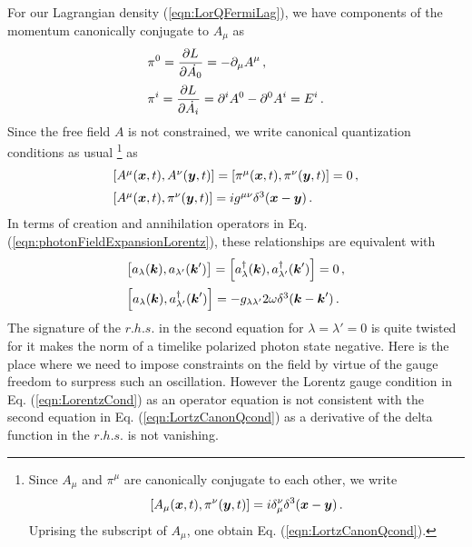 For our Lagrangian density (\ref{eqn:LorQFermiLag}), we have
components of the momentum canonically conjugate to $A_\mu$ as
\begin{eqnarray}
\begin{array}{l}
\displaystyle
\pi^0 
= 
\frac{\partial L_{}}{\partial \dot{A_0}}
= 
- \partial_\mu A^\mu \,,
\vspace{2mm}
\\
\displaystyle
\pi^i =
\frac{\partial L_{}}
{\partial \dot{A_i}}
=
\partial^i A^0 - \partial^0 A^i
= 
E^i \,.
\end{array}
\end{eqnarray}
Since the free field $A$ is not constrained, we write canonical quantization conditions 
as usual
\footnote{%
Since $A_\mu$ and $\pi^\mu$ are canonically conjugate to each other,
we write
\begin{eqnarray*}
\left[
A_\mu(\mbox{\boldmath $x$}, t),  \pi^\nu(\mbox{\boldmath $y$}, t)
\right]
=
i \delta_\mu^{\nu} \delta^3( \mbox{\boldmath $x$} - \mbox{\boldmath $y$}) \,.
\end{eqnarray*}
Uprising the subscript of $A_\mu$, one obtain
Eq. (\ref{eqn:LortzCanonQcond}).
}%
 as
\begin{eqnarray}
\begin{array}{l}
\left[
A^\mu(\bld{x}, t),  A^\nu(\bld{y}, t)
\right]
=
\left[
\pi^\mu(\bld{x}, t),  \pi^\nu(\bld{y}, t)
\right]
= 0 \,,
\vspace{2mm}
\\
\left[
A^\mu(\bld{x}, t),  \pi^\nu(\bld{y}, t)
\right]
=
i g^{\mu \nu} \delta^3( \bld{x} - \bld{y}) \,.
\label{eqn:LortzCanonQcond}
\end{array}
\end{eqnarray}
In terms of creation and annihilation operators in Eq. (\ref{eqn:photonFieldExpansionLorentz}), 
these relationships are equivalent with
\begin{eqnarray}
\begin{array}{l}
\left[
a_\lambda(\bld{k}), a_{\lambda'}(\bld{k}')
\right]
=
\left[
a^\dagger_\lambda(\bld{k}), a^\dagger_{\lambda'}(\bld{k}')
\right]
= 0 \,,
\vspace{2mm}
\\
\left[
a_\lambda(\bld{k}), a^\dagger_{\lambda'}(\bld{k}')
\right]
=
- g_{\lambda \lambda'} 2\omega \delta^3(\bld{k} - \bld{k}') \,.
\end{array}
\label{eqn:creanncommLorGauge}
\end{eqnarray}
The signature of the $r.h.s.$ in the second equation for $\lambda = \lambda' = 0$
is quite twisted for it makes the norm of a timelike polarized photon state negative.
Here is the place where we need to impose constraints on the field 
by virtue of the gauge freedom to surpress such an oscillation.
However the Lorentz gauge condition in Eq. (\ref{eqn:LorentzCond}) 
as an operator equation is not consistent with the second equation in
Eq. (\ref{eqn:LortzCanonQcond}) as a derivative of the delta function
in the $r.h.s.$ is not vanishing.

